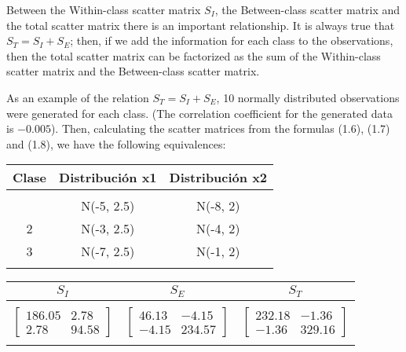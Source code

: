 Between the Within-class scatter matrix $S_I$, the Between-class scatter matrix and the total scatter matrix there is an important relationship. It is always true that $S_T = S_I + S_E$; then, 
if we add the information for each class to the observations, then the total scatter matrix can be factorized as the sum of the Within-class scatter matrix and the Between-class scatter matrix.

\pagebreak
As an example of the relation $S_T = S_I + S_E$, 10 normally distributed observations were generated for each class. (The correlation coefficient for the generated data is $-0.005$). Then, calculating the scatter matrices from the formulas (1.6), (1.7) and (1.8), we have the following equivalences: 
\begin{center}
\begin{tabular}{ c c c}
\toprule
\textbf{Clase} & \textbf{Distribución x1} & \textbf{Distribución x2} \\
\midrule\\
\addlinespace[-2ex]
1 & N(-5, 2.5) & N(-8, 2)\\
2 & N(-3, 2.5) & N(-4, 2)\\
3 & N(-7, 2.5) & N(-1, 2) \\
\addlinespace[1.5ex]
\bottomrule
\end{tabular}
\end{center}

\begin{center}
\begin{tabular}{ c c c}
\toprule
\textbf{$S_I$} & \textbf{$S_E$} & \textbf{$S_T$} \\
\midrule\\
\addlinespace[-2ex]
$ \begin{bmatrix}  186.05 & 2.78 \\ 2.78 &  94.58 \end{bmatrix}$ &
$ \begin{bmatrix} 46.13 & -4.15 \\ -4.15 & 234.57 \end{bmatrix}$ &
$ \begin{bmatrix}  232.18 & -1.36 \\ -1.36 &  329.16 \end{bmatrix}$ \\
\addlinespace[1.5ex]
\bottomrule
\end{tabular}
\end{center}

